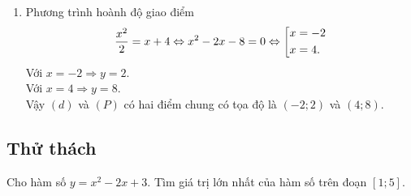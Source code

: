 \begin{bt}
{\begin{enumerate}
		\item Phương trình hoành độ giao điểm
		\begin{align*}
			\dfrac{x^2}{2} = x + 4 \Leftrightarrow x^2 - 2x - 8 = 0 \Leftrightarrow \left[\begin{aligned}& x = -2 \\& x = 4.\end{aligned}\right.
		\end{align*}
		Với $ x = -2 \Rightarrow y = 2 $.\\
		Với $ x = 4 \Rightarrow y = 8 $.\\
		Vậy $ (d) $ và $ (P) $ có hai điểm chung có tọa độ là $ (-2;2) $ và $ (4;8) $.
		
		
	\end{enumerate}
	}
\end{bt}


\subsection{Thử thách}
\begin{bt}
	Cho hàm số $ y = x^2 - 2x + 3 $. Tìm giá trị lớn nhất của hàm số trên đoạn $ \left[1;5\right] $.
\end{bt}

